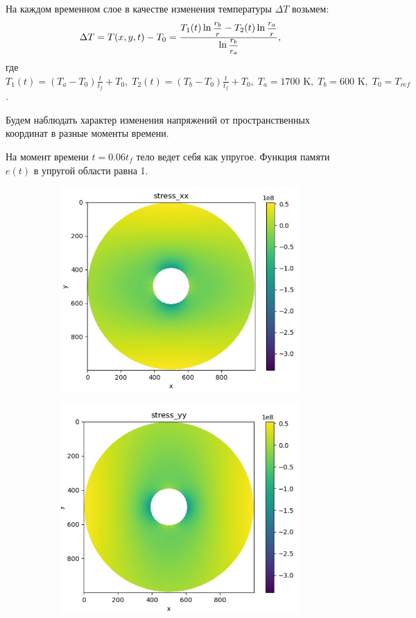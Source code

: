 \documentclass[12pt, a4paper]{article}
\begin{document}
	 На каждом временном слое в качестве изменения температуры $\Delta T$ возьмем:
	 \[
	 \Delta T = T(x,y,t)-T_0=\frac{T_1(t)\ln\hbox{\footnotesize$\displaystyle\frac{r_b}{r}$}-T_2(t)\ln\hbox{\footnotesize$\displaystyle\frac{r_a}{r}$}}{\ln\hbox{\footnotesize$\displaystyle\frac{r_b}{r_a}$}},
	 \]
	 где $T_1(t)=(T_a-T_0)\frac{t}{t_f}+T_0,\;T_2(t)=(T_b-T_0)\frac{t}{t_f}+T_0,\;T_a = 1700 \text{ K},\;T_b = 600 \text{ K},\;T_0=T_{ref}$.
	 
	 Будем наблюдать характер изменения напряжений от пространственных координат в разные моменты времени.
	 
	 На момент времени $t = 0.06t_f$ тело ведет себя как упругое. Функция памяти $e(t)$ в упругой области равна 1.
	 \begin{figure}[H]
	 	\centering
	 	\begin{subfigure}[H]{0.38\textwidth}
	 		\includegraphics[width=\textwidth]{stressx_06tf}
	 	\end{subfigure}
	 	\qquad\qquad
	 	\begin{subfigure}[H]{0.38\textwidth}
	 		\includegraphics[width=\textwidth]{stressy_06tf}

\end{subfigure}
\end{figure}
\end{document}
